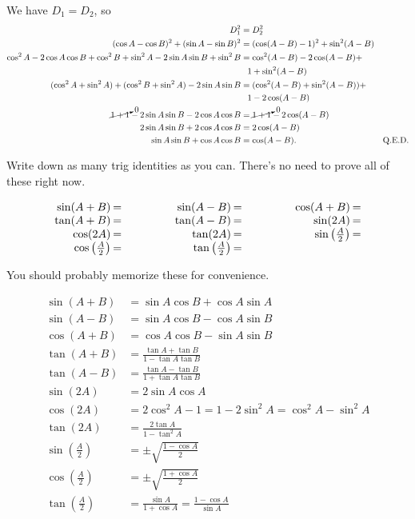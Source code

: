 \documentclass[../gatm_answers.tex]{subfiles}
\begin{document}
We have $D_1=D_2$, so
\begin{align*}
D_1^2&=D_2^2 \\
(\cos A - \cos B)^2 + (\sin A - \sin B)^2 &= (\cos(A-B)-1)^2+\sin^2 (A-B) \\
\cos^2 A - 2\cos A\cos B + \cos^2 B + \sin^2 A - 2\sin A\sin B + \sin^2 B &= \cos^2 (A-B) - 2\cos(A-B) + \\ &\phantom{=} 1+\sin^2(A-B) \\
(\cos^2 A + \sin^2 A) + (\cos^2 B + \sin^2 A) - 2\sin A\sin B &= (\cos^2 (A-B) + \sin^2(A-B)) + \\ &\phantom{=} 1 - 2\cos(A-B) \\
\cancelto{0}{1 + 1} - 2\sin A\sin B - 2\cos A\cos B &= \cancelto{0}{1 + 1} - 2\cos(A-B) \\
2\sin A\sin B + 2\cos A\cos B &= 2\cos(A-B) \\
\sin A\sin B + \cos A\cos B &= \cos(A-B). & \text{Q.E.D.} \\
\end{align*}

\begin{outer_problem}
\item Write down as many trig identities as you can. There's no need to prove all of these right now.

\renewcommand{\arraystretch}{1.1}
$$\arraycolsep=1pt\begin{array}{rlrlrl}
\sin(A+B)&=\qquad\qquad\phantom{.}&\sin(A-B) &=\qquad\qquad\phantom{.}&\cos(A+B) &= \\
\tan(A+B)&= &\tan(A-B) &= &\sin(2A) &= \\
\cos(2A)&= &\tan(2A) &= &\sin\left(\frac{A}{2}\right) &= \\
\cos\left(\frac{A}{2}\right)&= &\tan\left(\frac{A}{2}\right) &= & & \\
\end{array}$$
\end{outer_problem}

You should probably memorize these for convenience.

\renewcommand{\arraystretch}{1.1}
\begin{align*}
\sin(A+B)&= \sin A \cos B + \cos A \sin A \\
\sin(A-B) &= \sin A \cos B - \cos A \sin B \\
\cos(A+B) &= \cos A \cos B - \sin A \sin B \\
\tan(A+B)&= \frac{\tan A + \tan B}{1-\tan A\tan B}\\
\tan(A-B) &= \frac{\tan A - \tan B}{1+\tan A\tan B}\\
\sin(2A) &= 2\sin A\cos A\\
\cos(2A)&= 2\cos^2 A - 1 = 1 - 2\sin^2 A = \cos^2 A - \sin^2 A \\
\tan(2A) &= \frac{2\tan A}{1-\tan^2 A}\\
\sin\left(\frac{A}{2}\right) &= \pm\sqrt{\frac{1-\cos A}{2}}\\
\cos\left(\frac{A}{2}\right)&= \pm\sqrt{\frac{1+\cos A}{2}}\\
\tan\left(\frac{A}{2}\right) &= \frac{\sin A}{1+\cos A} = \frac{1-\cos A}{\sin A}
\end{align*}
\end{document}
